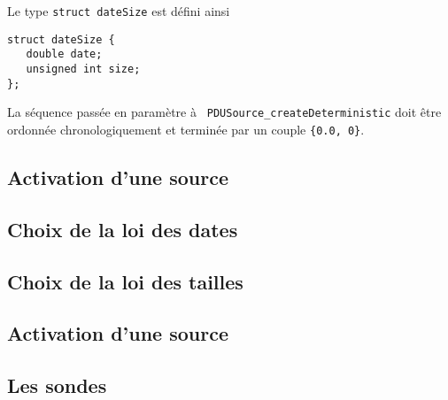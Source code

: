    Le type {\tt struct dateSize} est défini ainsi

\begin{verbatim}
struct dateSize {
   double date;
   unsigned int size;
};
\end{verbatim}

   La séquence passée en paramètre à {\tt
     PDUSource\_createDeterministic} doit être ordonnée
   chronologiquement et terminée par un couple {\tt \{0.0, 0\}}.
%
\subsection{Activation d'une source}

%
\subsection{Choix de la loi des dates}

%
\subsection{Choix de la loi des tailles}

%
\subsection{Activation d'une source}

%
\subsection{Les sondes}



